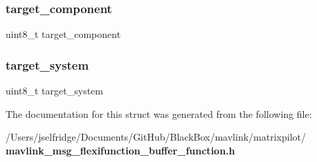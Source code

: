 \subsubsection{target\+\_\+component}
{\footnotesize\ttfamily uint8\+\_\+t target\+\_\+component}

\mbox{\label{struct____mavlink__flexifunction__buffer__function__t_ac9afff43526a157e4c4e45607c1418b8}} 
\subsubsection{target\+\_\+system}
{\footnotesize\ttfamily uint8\+\_\+t target\+\_\+system}



The documentation for this struct was generated from the following file\+:\begin{DoxyCompactItemize}
\item 
/\+Users/jselfridge/\+Documents/\+Git\+Hub/\+Black\+Box/mavlink/matrixpilot/\textbf{ mavlink\+\_\+msg\+\_\+flexifunction\+\_\+buffer\+\_\+function.\+h}\end{DoxyCompactItemize}

